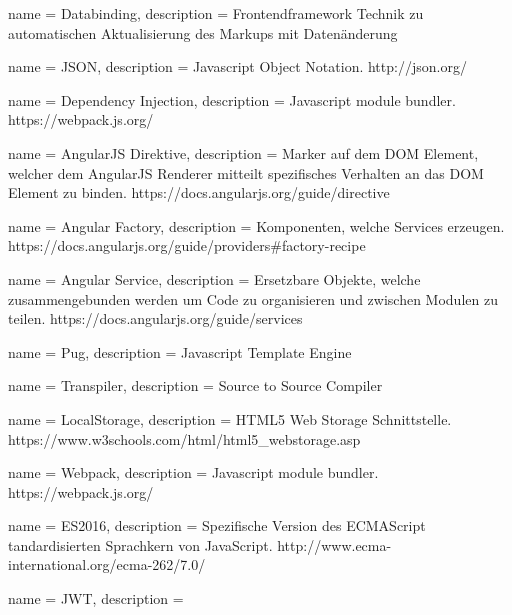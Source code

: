 {
  name = Databinding,
  description = { Frontendframework Technik zu automatischen Aktualisierung des Markups mit Datenänderung }
}

{
  name = JSON,
  description = { Javascript Object Notation. http://json.org/ }
}

{
  name = Dependency Injection,
  description = { Javascript module bundler.  https://webpack.js.org/ }
}

{
  name = AngularJS Direktive,
  description = { Marker auf dem DOM Element, welcher dem AngularJS Renderer mitteilt spezifisches Verhalten an das DOM Element zu binden. https://docs.angularjs.org/guide/directive }
}

{
  name = Angular Factory,
  description = { Komponenten, welche Services erzeugen. https://docs.angularjs.org/guide/providers\#factory-recipe }
}


{
  name = Angular Service,
  description = { Ersetzbare Objekte, welche zusammengebunden werden um Code zu organisieren und zwischen Modulen zu teilen. https://docs.angularjs.org/guide/services }
}

{
  name = Pug,
  description = { Javascript Template Engine }
}

{
  name = Transpiler,
  description = {Source to Source Compiler}
}

{
  name = LocalStorage,
  description = { HTML5 Web Storage Schnittstelle. https://www.w3schools.com/html/html5\_webstorage.asp }
}


{
  name = Webpack,
  description = { Javascript module bundler. https://webpack.js.org/ }
}

{
  name = ES2016,
  description = { Spezifische Version des ECMAScript tandardisierten Sprachkern von JavaScript. http://www.ecma-international.org/ecma-262/7.0/ }
}


{
  name = JWT,
  description = {}
}
